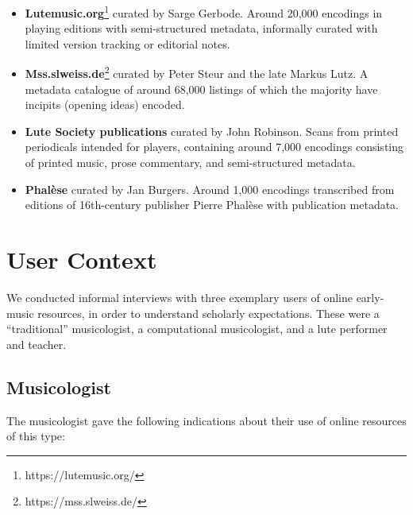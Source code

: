\documentclass[9pt,twocolumn]{extarticle}
\begin{document}
\begin{sloppypar}
  \begin{itemize}
    \item {\bf Lutemusic.org}\footnote{https://lutemusic.org/} curated
      by Sarge Gerbode. Around 20,000 encodings in playing editions
      with semi-structured metadata, informally curated with limited
      version tracking or editorial notes.
    \item {\bf Mss.slweiss.de}\footnote{https://mss.slweiss.de/}
      curated by Peter Steur and the late Markus Lutz. A metadata
      catalogue of around 68,000 listings of which the majority have
      incipits (opening ideas) encoded.
    \item {\bf Lute Society publications} curated by John
      Robinson. Scans from printed periodicals intended for players,
      containing around 7,000 encodings consisting of printed music,
      prose commentary, and semi-structured metadata.
    \item {\bf Phal\`ese} curated by Jan Burgers. Around 1,000
      encodings transcribed from editions of 16th-century publisher
      Pierre Phal\`ese with publication metadata.

  \end{itemize}

  
  \section{User Context}\label{user-context}

  We conducted informal interviews with three exemplary users of
  online early-music resources, in order to understand scholarly
  expectations. These were a ``traditional'' musicologist, a
  computational musicologist, and a lute performer and teacher.
  
  \subsection{Musicologist}

  The musicologist gave the following indications about their use of
  online resources of this type:


\end{sloppypar}
\end{document}
